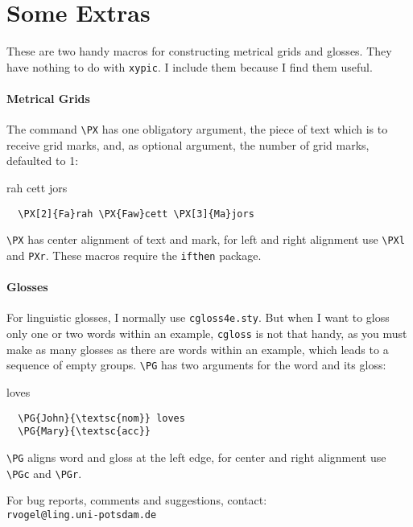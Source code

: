 \documentclass[12pt,a4paper]{article}
\begin{document}
\section{Some Extras}
\label{sec:extras}

These are two handy macros for constructing metrical grids and glosses. They
have nothing to do with \texttt{xypic}. I include them because I find them
useful.

\paragraph{Metrical Grids}

The command \verb|\PX| has one obligatory argument, the piece of text which is
to receive grid marks, and, as optional argument, the number of grid marks,
defaulted to 1:

\begin{minipage}[t]{4cm}
  rah cett jors
\end{minipage}
\begin{minipage}[t]{5cm}
\begin{verbatim}
  \PX[2]{Fa}rah \PX{Faw}cett \PX[3]{Ma}jors
\end{verbatim}
\end{minipage}

\verb|\PX| has center alignment of text and mark, for left and right alignment
use \verb|\PXl| and \verb|PXr|. These macros require the \texttt{ifthen}
package.


\paragraph{Glosses}
For linguistic glosses, I normally use \texttt{cgloss4e.sty}. But when I want to
gloss only one or two words within an example, \texttt{cgloss} is not that
handy, as you must make as many glosses as there are words within an example,
which leads to a sequence of empty groups. \verb|\PG| has two arguments for the
word and its gloss:

\begin{minipage}[t]{3cm}
   loves 
\end{minipage}
\begin{minipage}[t]{7cm}
\begin{verbatim}
  \PG{John}{\textsc{nom}} loves
  \PG{Mary}{\textsc{acc}}
\end{verbatim}
\end{minipage}

\verb|\PG| aligns word and gloss at the left edge, for center and right
alignment use \verb|\PGc| and \verb|\PGr|.


\bigskip

For bug reports, comments and suggestions, contact:\\
\texttt{rvogel@ling.uni-potsdam.de}
\end{document}
